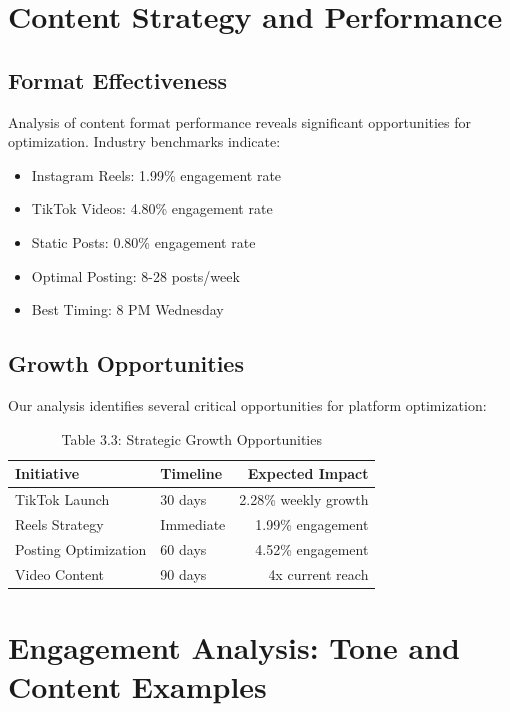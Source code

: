 \documentclass[12pt]{report}
\begin{document}
\chapter{Content Strategy and Performance}

\section{Format Effectiveness}

Analysis of content format performance reveals significant opportunities for optimization. Industry benchmarks indicate:

\begin{itemize}
    \item Instagram Reels: 1.99\% engagement rate
    \item TikTok Videos: 4.80\% engagement rate
    \item Static Posts: 0.80\% engagement rate
    \item Optimal Posting: 8-28 posts/week
    \item Best Timing: 8 PM Wednesday
\end{itemize}

\section{Growth Opportunities}

Our analysis identifies several critical opportunities for platform optimization:

\begin{table}[h]
\caption{Table 3.3: Strategic Growth Opportunities}
\begin{tabular}{@{}llr@{}}
\toprule
\textbf{Initiative} & \textbf{Timeline} & \textbf{Expected Impact} \\
\midrule
TikTok Launch & 30 days & 2.28\% weekly growth \\
Reels Strategy & Immediate & 1.99\% engagement \\
Posting Optimization & 60 days & 4.52\% engagement \\
Video Content & 90 days & 4x current reach \\
\bottomrule
\end{tabular}
\end{table}

\chapter{Engagement Analysis: Tone and Content Examples}
\end{document}
